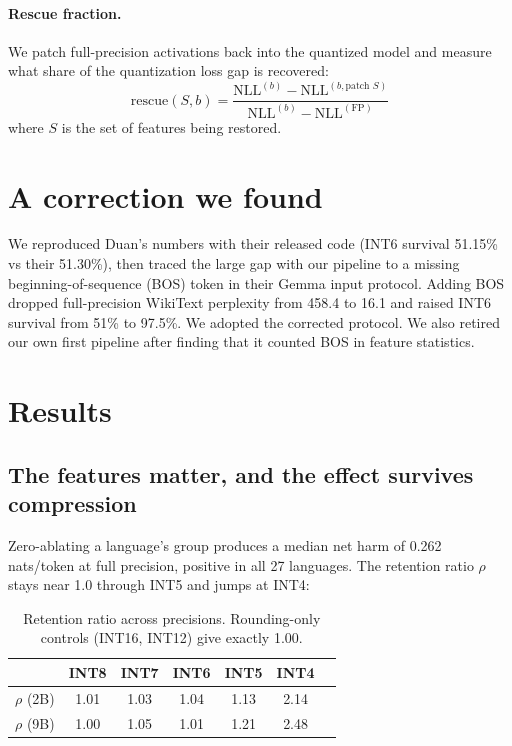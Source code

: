 \documentclass[11pt]{article}
\begin{document}
\paragraph{Rescue fraction.} We patch full-precision activations back into the quantized model and measure what share of the quantization loss gap is recovered:
\begin{equation}
\text{rescue}(S, b) = \frac{\mathrm{NLL}^{(b)} - \mathrm{NLL}^{(b, \text{patch } S)}}{\mathrm{NLL}^{(b)} - \mathrm{NLL}^{(\mathrm{FP})}}
\end{equation}
where $S$ is the set of features being restored.

\section{A correction we found}

We reproduced Duan's numbers with their released code (INT6 survival 51.15\% vs their 51.30\%), then traced the large gap with our pipeline to a missing beginning-of-sequence (BOS) token in their Gemma input protocol. Adding BOS dropped full-precision WikiText perplexity from 458.4 to 16.1 and raised INT6 survival from 51\% to 97.5\%. We adopted the corrected protocol. We also retired our own first pipeline after finding that it counted BOS in feature statistics.

\section{Results}

\subsection{The features matter, and the effect survives compression}

Zero-ablating a language's group produces a median net harm of 0.262 nats/token at full precision, positive in all 27 languages. The retention ratio $\rho$ stays near 1.0 through INT5 and jumps at INT4:

\begin{table}[h]
\centering\small
\begin{tabular}{lcccccc}
\toprule
& INT8 & INT7 & INT6 & INT5 & INT4 \\
\midrule
$\rho$ (2B) & 1.01 & 1.03 & 1.04 & 1.13 & 2.14 \\
$\rho$ (9B) & 1.00 & 1.05 & 1.01 & 1.21 & 2.48 \\
\bottomrule
\end{tabular}
\caption{Retention ratio across precisions. Rounding-only controls (INT16, INT12) give exactly 1.00.}
\end{table}
\end{document}
